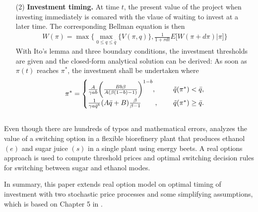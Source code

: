 \documentclass[11pt,letter]{article}
\theoremstyle{definition}
\theoremstyle{remark}
\numberwithin{equation}{section}
\begin{document}
\begin{itemize}
    \item[(2)] \textbf{Investment timing.} At time $t$, the present value of the project when investing immediately is comared with the vlaue of waiting to invest at a later time. The corresponding Bellman equation is then
    \begin{align*}
        W(\pi)=\max\bigg\{\max_{0\le q\le\bar{q}}\{V(\pi,q)\},\frac{1}{1+rdt}E\Big[W(\pi+d\pi)\Big|\pi\Big]\bigg\}
    \end{align*}
    With Ito's lemma and three boundary conditions, the investment thresholds are given and the closed-form analytical solution can be derived: As soon as $\pi(t)$ reaches $\pi^*$, the investment shall be undertaken where
    \begin{align*}
    \pi^*=
    \begin{cases}
    \frac{A}{\gamma ab}\bigg(\frac{Bb\beta}{A(\beta(1-b)-1)}\bigg)^{1-b},~~~~~&\tilde{q}(\pi^*)<\bar{q},\\
    \frac{1}{\gamma a\bar{q}^b}(A\bar{q}+B)\frac{\beta}{\beta-1}~~~~~~,~~~&\tilde{q}(\pi^*)\ge\bar{q}.
    \end{cases}
    \end{align*}
\end{itemize}


\subsection{\cite{hossiso2017value}}
Even though there are hundreds of typos and mathematical errors, \cite{hossiso2017value} analyzes the value of a switching option in a flexible biorefinery plant that produces ethanol $(e)$ and sugar juice $(s)$ in a single plant using energy beets. A real options approach is used to compute threshold prices and optimal switching decision rules for switching between sugar and ethanol modes.

In summary, this paper extends real option model on optimal timing of investment with two stochastic price processes and some simplifying assumptions, which is based on Chapter 5 in \cite{dixit1994investment}.
\end{document}
